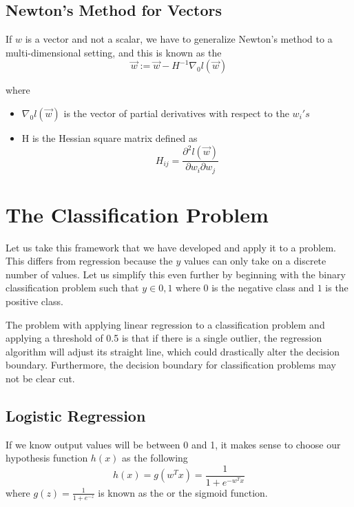\documentclass[12pt]{scrartcl}
\begin{document}
\subsection{Newton's Method for Vectors}
\begin{definition}
    If $w$ is a vector and not a scalar, we have
    to generalize Newton's method to a multi-dimensional setting,
    and this is known as the
    \\ 
    \[\vec{w} := \vec{w} - H^{-1}\nabla_0l(\vec{w})\]
\end{definition}
where
\begin{itemize}
    \item $\nabla_0l(\vec{w})$ is the vector of partial derivatives
          with respect to the $w_i's$
    \item H is the Hessian square matrix defined as
          \[H_{ij} = \frac{\partial^2 l(\vec{w})}{\partial w_i \partial w_j}\]
\end{itemize}

\section{The Classification Problem}

\begin{definition}
    Let us take this framework that we have developed and
    apply it to a  problem. This differs from
    regression because the $y$ values can only take on a discrete
    number of values. Let us simplify this even further by beginning with the
    binary classification problem such that $y \in 0, 1$
    where $0$ is the negative class and $1$ is the
    positive class.
\end{definition}

\begin{note}
    The problem with applying linear regression to a
    classification problem and applying a threshold of 0.5
    is that if there is a single outlier, the regression
    algorithm will adjust its straight line, which could drastically
    alter the decision boundary. Furthermore, the decision
    boundary for classification problems may not be clear cut.
\end{note}

\subsection{Logistic Regression}

\begin{definition}
    If we know output values will be between 0 and 1,
    it makes sense to choose our hypothesis function
    $h(x)$ as the following
    \[h(x) = g(w^Tx) = \frac{1}{1 + e^{-w^Tx}}\]
    where $g(z) = \frac{1}{1 + e^{-z}}$ is known as the 
    or the sigmoid function.
\end{definition}
\end{document}
